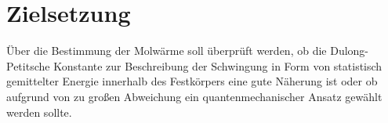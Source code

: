 \section{Zielsetzung}
\label{sec:Zielsetzung}
Über die Bestimmung der Molwärme soll überprüft werden, ob die
Dulong-Petitsche Konstante zur Beschreibung der Schwingung in Form von
statistisch gemittelter Energie innerhalb des Festkörpers eine gute
Näherung ist oder ob aufgrund von zu großen Abweichung
ein quantenmechanischer Ansatz gewählt werden sollte.
